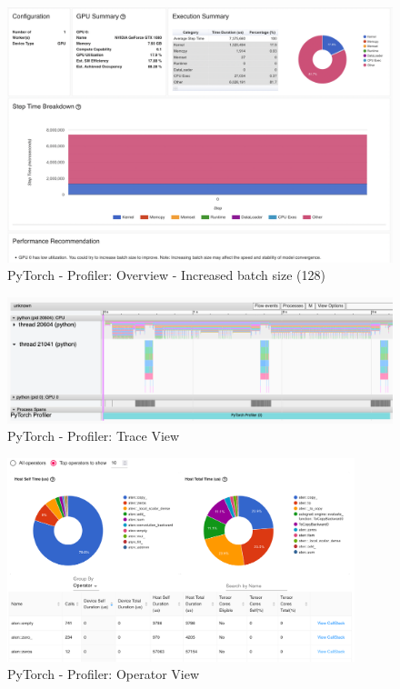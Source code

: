 \documentclass[12pt, a4paper, hidelinks]{article}
\begin{document}
\begin{figure}[H]
\centering
\includegraphics[width=1\textwidth]{./assets/scap_gtx1080_profiler-torch_batch-size-128_14650759}
\caption[PyTorch - Profiler: Overview - Increased batch size (128)]{PyTorch - Profiler: Overview - Increased batch size (128)}
\label{fig:scap_gtx1080_profiler-torch_batch-size-128_14650759}
\end{figure}

\begin{figure}[H]
\centering
\includegraphics[width=1\textwidth]{./assets/scap_gtx1080_profiler-torch_batch-size-64_14650758_trace-view}
\caption[PyTorch - Profiler: Trace View]{PyTorch - Profiler: Trace View}
\label{fig:scap_gtx1080_profiler-torch_batch-size-64_14650758_trace-view}
\end{figure}

\begin{figure}[H]
\centering
\includegraphics[width=0.9\textwidth]{./assets/scap_gtx1080_profiler-torch_batch-size-64_14650758_operator-view}
\caption[PyTorch - Profiler: Operator View]{PyTorch - Profiler: Operator View}
\label{fig:scap_gtx1080_profiler-torch_batch-size-64_14650758_operator-view}
\end{figure}
\end{document}
